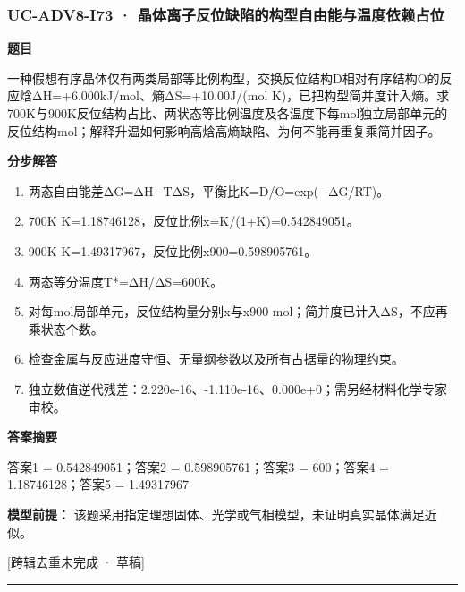\documentclass[UTF8,11pt,a4paper]{ctexart}
\begin{document}
\subsubsection*{UC-ADV8-I73 · 晶体离子反位缺陷的构型自由能与温度依赖占位}
\noindent\textbf{题目}\par
一种假想有序晶体仅有两类局部等比例构型，交换反位结构D相对有序结构O的反应焓ΔH=+6.000kJ/mol、熵ΔS=+10.00J/(mol K)，已把构型简并度计入熵。求700K与900K反位结构占比、两状态等比例温度及各温度下每mol独立局部单元的反位结构mol；解释升温如何影响高焓高熵缺陷、为何不能再重复乘简并因子。\par
\medskip\noindent\textbf{分步解答}
\begin{enumerate}
\item 两态自由能差ΔG=ΔH−TΔS，平衡比K=D/O=exp(−ΔG/RT)。
\item 700K K=1.18746128，反位比例x=K/(1+K)=0.542849051。
\item 900K K=1.49317967，反位比例x900=0.598905761。
\item 两态等分温度T*=ΔH/ΔS=600K。
\item 对每mol局部单元，反位结构量分别x与x900 mol；简并度已计入ΔS，不应再乘状态个数。
\item 检查金属与反应进度守恒、无量纲参数以及所有占据量的物理约束。
\item 独立数值逆代残差：2.220e-16、-1.110e-16、0.000e+0；需另经材料化学专家审校。
\end{enumerate}
\noindent\textbf{答案摘要}\par
答案1 = 0.542849051；答案2 = 0.598905761；答案3 = 600；答案4 = 1.18746128；答案5 = 1.49317967\par
\noindent\textbf{模型前提：}
该题采用指定理想固体、光学或气相模型，未证明真实晶体满足近似。\par
\noindent\textcolor{red!65!black}{[跨辑去重未完成 · 草稿]} \par
\medskip\hrule\medskip
{}
\end{document}
